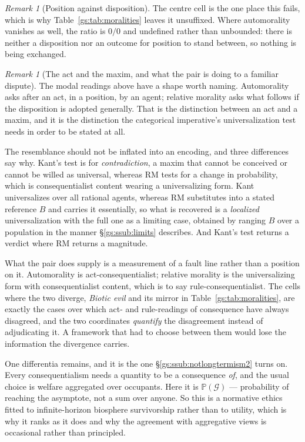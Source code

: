 \documentclass[11pt]{article}
\numberwithin{equation}{section}
\theoremstyle{plain}
\theoremstyle{definition}
\theoremstyle{remark}
\newtheorem{remark}[theorem]{Remark}
\newcommand{\PP}{\mathbb{P}}
\begin{document}
\begin{remark}[Position against disposition]
The centre cell is the one place this fails, which is why
Table~\ref{gs:tab:moralities} leaves it unsuffixed. Where automorality
vanishes as well, the ratio is $0/0$ and undefined rather than unbounded:
there is neither a disposition nor an outcome for position to stand
between, so nothing is being exchanged.
\end{remark}

\begin{remark}[The act and the maxim, and what the pair is doing to a
familiar dispute]\label{gs:rem:maxim}
The modal readings above have a shape worth naming. Automorality asks
after an act, in a position, by an agent; relative morality asks what
follows if the disposition is adopted generally. That is the distinction
between an act and a maxim, and it is the distinction the categorical
imperative's universalization test needs in order to be stated at all.

The resemblance should not be inflated into an encoding, and three
differences say why. Kant's test is for \emph{contradiction}, a maxim
that cannot be conceived or cannot be willed as universal, whereas
$\mathrm{RM}$ tests for a change in probability, which is
consequentialist content wearing a universalizing form. Kant
universalizes over all rational agents, whereas $\mathrm{RM}$ substitutes
into a stated reference $B$ and carries it essentially, so what is
recovered is a \emph{localized} universalization with the full one as a
limiting case, obtained by ranging $B$ over a population in the manner
\S\ref{gs:ssub:limits} describes. And Kant's test returns a verdict where
$\mathrm{RM}$ returns a magnitude.

What the pair does supply is a measurement of a fault line rather than a
position on it. Automorality is act-consequentialist; relative morality
is the universalizing form with consequentialist content, which is to say
rule-consequentialist. The cells where the two diverge, \emph{Biotic evil} and its mirror in
Table~\ref{gs:tab:moralities}, are exactly the cases over which act-
and rule-readings of consequence have always disagreed, and the two
coordinates \emph{quantify} the disagreement instead of adjudicating it.
A framework that had to choose between them would lose the information
the divergence carries.

One differentia remains, and it is the one \S\ref{gs:ssub:notlongtermism2}
turns on. Every consequentialism needs a quantity to be a consequence
\emph{of}, and the usual choice is welfare aggregated over occupants.
Here it is $\PP(\mathcal G)$ --- probability of reaching the asymptote,
not a sum over anyone. So this is a normative ethics fitted to
infinite-horizon biosphere survivorship rather than to utility, which is
why it ranks as it does and why the agreement with aggregative views is
occasional rather than principled.
\end{remark}
\end{document}
